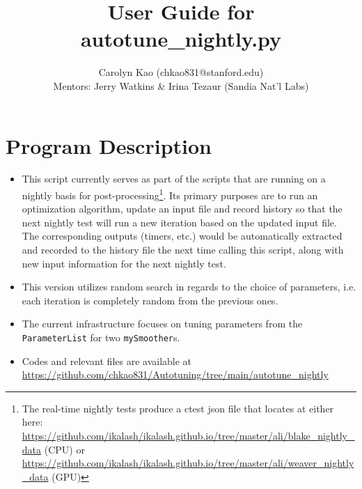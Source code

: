 \documentclass[a4paper]{article}
\title{User Guide for autotune\_nightly.py}
\author{Carolyn Kao (chkao831@stanford.edu)\\
Mentors: Jerry Watkins \& Irina Tezaur (Sandia Nat'l Labs) }
\begin{document}
\maketitle


\section{Program Description}
\begin{itemize}
  \item This script currently serves as part of the scripts that are running on a nightly basis for post-processing\footnote{The real-time nightly tests produce a ctest json file that locates at either here: \url{https://github.com/ikalash/ikalash.github.io/tree/master/ali/blake_nightly_data} (CPU) or \url{https://github.com/ikalash/ikalash.github.io/tree/master/ali/weaver_nightly_data} (GPU)}. Its primary purposes are to run an optimization algorithm, update an input file and record history so that the next nightly test will run a new iteration based on the updated input file. The corresponding outputs (timers, etc.) would be automatically extracted and recorded to the history file the next time calling this script, along with new input information for the next nightly test. 
  \item This version utilizes random search in regards to the choice of parameters, i.e. each iteration is completely random from the previous ones.
  \item The current infrastructure focuses on tuning parameters from the \texttt{ParameterList} for two \texttt{mySmoother}s. 
  \item Codes and relevant files are available at \url{https://github.com/chkao831/Autotuning/tree/main/autotune_nightly}
\end{itemize}
\end{document}
